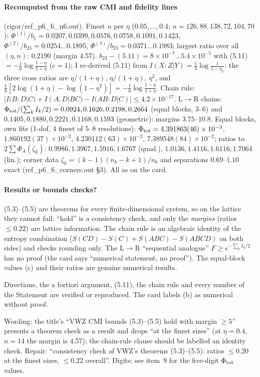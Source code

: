 \documentclass[11pt]{article}
\begin{document}
\paragraph{Recomputed from the raw CMI and fidelity lines} (rigor/ref\_p6\_6\_n6.out). Finest $n$ per $\eta$
($0.05,\dots,0.4$; $n=126,88,138,72,104,70$): $\Phi^{(1)}/b_1=0.0207,0.0399,0.0576,0.0758,0.1091,0.1423$,
$\Phi^{(2)}/b_{23}=0.0254\dots0.1895$, $\Phi^{(3)}/b_{23}=0.0371\dots0.1983$; largest ratio over all
$(\eta,n)$: $0.2190$ (margin 4.57). $b_{23}-(5.11)=8\times10^{-7}\dots5.4\times10^{-5}$ with (5.11)
$=-\frac16\log\frac{1-\eta}{1+\eta}$ ($c=1$); I re-derived (5.11) from $I(X{:}Z|Y)=\frac13\log\frac1{1-\eta_V}$:
the three cross ratios are $\eta/(1+\eta)$, $\eta/(1+\eta)$, $\eta^2$, and
$\frac16[2\log(1+\eta)-\log(1-\eta^2)]=-\frac16\log\frac{1-\eta}{1+\eta}$. Chain rule:
$|I(B{:}D|C)+I(A{:}D|BC)-I(AB{:}D|C)|\le4.2\times10^{-17}$. L$\to$R chains: $\Phi_{\rm tot}/(\sum_kI_k/2)=
0.0924,0.1626,0.2198,0.2664$ (equal blocks, 3--6) and $0.1405,0.1880,0.2221,0.1168,0.1593$ (geometric): margins
$3.75$--$10.8$. Equal blocks, own fits (1-dof, 4 finest of 5--8 resolutions): $\Phi_{\rm tot}=4.391863(46)\times10^{-3}$,
$1.860192(37)\times10^{-2}$, $4.230112(63)\times10^{-2}$, $7.389548(84)\times10^{-2}$; ratios to
$2\sum\Phi_A(\zeta_k)$: $0.9986,1.3967,1.5916,1.6767$ (quad.), $1.0136,1.4116,1.6116,1.7064$ (lin.); corner data
$\zeta_k=(k-1)(n_b-k+1)/n_b$ and separations $0.69$--$1.10$ exact (ref\_p6\_6\_corners.out \S3). All as on the card.

\paragraph{Results or bounds checks?} (5.3)--(5.5) are theorems for every finite-dimensional system, so on the
lattice they cannot fail: ``hold'' is a consistency check, and only the \emph{margins} (ratios $\le0.22$) are
lattice information. The chain rule is an algebraic identity of the entropy combination
($S(CD)-S(C)+S(ABC)-S(ABCD)$ on both sides) and checks rounding only. The L$\to$R ``sequential analogue''
$F\ge e^{-\sum_kI_k/2}$ has no proof (the card says ``numerical statement, no proof''). The equal-block values (c)
and their ratios are genuine numerical results.
\begin{verdictok}
Directions, the a fortiori argument, (5.11), the chain rule and every number of the Statement are verified or
reproduced. The card labels (b) as numerical without proof.
\end{verdictok}
\begin{verdictgap}
Wording: the title's ``VWZ CMI bounds (5.3)--(5.5) hold with margin $\ge5$'' presents a theorem check as a result
and drops ``at the finest sizes'' (at $\eta=0.4$, $n=14$ the margin is 4.57); the chain-rule clause should be
labelled an identity check. Repair: ``consistency check of VWZ's theorems (5.3)--(5.5): ratios $\le0.20$ at the
finest sizes, $\le0.22$ overall''. Digits: see item~9 for the five-digit $\Phi_{\rm tot}$ values.
\end{verdictgap}
\end{document}
